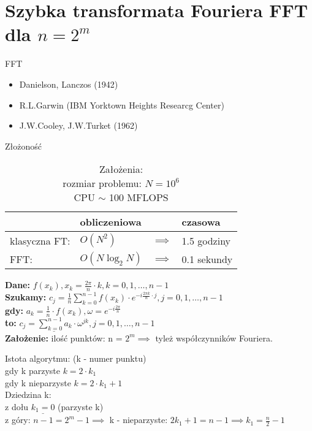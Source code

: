 \section{Szybka transformata Fouriera FFT dla $n=2^m$}
\begin{frame}[allowframebreaks]{FFT}
	\begin{itemize}
		\item Danielson, Lanczos (1942)
		\item R.L.Garwin (IBM Yorktown Heights Researcg Center)
		\item J.W.Cooley, J.W.Turket (1962)
	\end{itemize}
	\begin{table}
		\centering
		\caption{Złożoność}
		\begin{tabular}{l|lll}
			& obliczeniowa && czasowa \\
			\hline
			klasyczna FT: & $O(N^2)$ & $\implies$ & 1.5 godziny \\
			FFT: & $O(N\log_2N)$ & $\implies$ & 0.1 sekundy 
		\end{tabular}
		\caption*{Założenia: \\
			rozmiar problemu: $N = 10^6$ \\
			CPU $\sim$ 100 MFLOPS}
	\end{table}
	\textbf{Dane:} $f(x_k), x_k = \frac{2\pi}{n} \cdot k, k = 0, 1, \dots, n-1$ \\
	\textbf{Szukamy:} $c_j = \frac{1}{n} \sum\limits_{k = 0}^{n-1} f(x_k) \cdot e^{-i\frac{2\pi k}{n} \cdot j}, j = 0, 1, \dots, n-1$ \\
	\textbf{gdy:} $a_k = \frac{1}{n} \cdot f(x_k), \omega = e^{-i\frac{2\pi}{n}}$ \\
	\textbf{to:} $\underline{c_j = \sum\limits_{k = 0}^{n-1} a_k \cdot \omega^{jk}}, j = 0, 1, \dots, n-1$ \\
	\textbf{Założenie:} ilość punktów: n = $2^m \implies$ tyleż współczynników Fouriera. \\
	\begin{block}{Istota algorytmu:}
	(k - numer punktu) \\
	gdy k parzyste $k = 2 \cdot k_1$ \\
	gdy k nieparzyste $k = 2 \cdot k_1 + 1$ \\
	Dziedzina k: \\
	z dołu $\underline{k_1 = 0}$ (parzyste k)  \\
	z góry: $n-1 = 2^m - 1 \implies$ k - nieparzyste: $2k_1 + 1 = n-1 \implies k_1 = \frac{n}{2} - 1$ \\

\end{block}
\end{frame}
